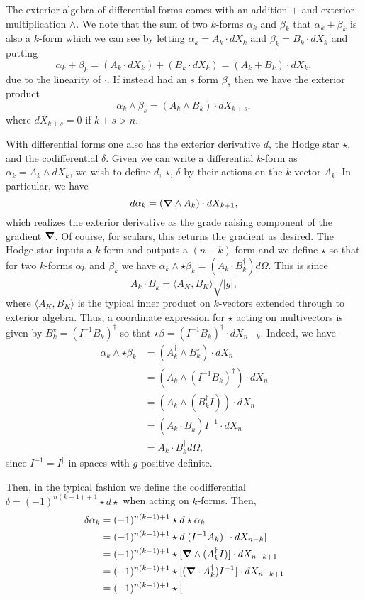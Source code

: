 \documentclass[12pt]{article}
\begin{document}
The exterior algebra of differential forms comes with an addition $+$ and exterior multiplication $\wedge$.  We note that the sum of two $k$-forms $\alpha_k$ and $\beta_k$ that $\alpha_k+\beta_k$ is also a $k$-form which we can see by letting $\alpha_k = A_k \cdot dX_k$ and $\beta_k = B_k \cdot dX_k$ and putting
\[
\alpha_k + \beta_k = (A_k \cdot dX_k)+(B_k \cdot dX_k) = (A_k + B_k) \cdot dX_k,
\]
due to the linearity of $\cdot$.  If instead had an $s$ form $\beta_s$ then we have the exterior product
\[
\alpha_k \wedge \beta_s = (A_k \wedge B_k) \cdot dX_{k+s},
\]
where $dX_{k+s}=0$ if $k+s>n$.  

With differential forms one also has the exterior derivative $d$, the Hodge star $\star$, and the codifferential $\delta$.  Given we can write a differential $k$-form as $\alpha_k = A_k \wedge dX_k$, we wish to define $d$, $\star$, $\delta$ by their actions on the $k$-vector $A_k$.  In particular, we have
\[
d \alpha_k = (\boldsymbol{\nabla} \wedge A_k) \cdot dX_{k+1},
\]
which realizes the exterior derivative as the grade raising component of the gradient $\boldsymbol{\nabla}$. Of course, for scalars, this returns the gradient as desired.  The Hodge star inputs a $k$-form and outputs a $(n-k)$-form and we define $\star$ so that for two $k$-forms $\alpha_k$ and $\beta_k$ we have $\alpha_k \wedge \star \beta_k  = (A_k\cdot B_k^\dagger)d\Omega$.  This is since
\[
A_k \cdot B_k^\dagger = \langle A_{K}, B_{K} \rangle \sqrt{|g|},
\]
where $\langle A_{K}, B_{K} \rangle$ is the typical inner product on $k$-vectors extended through to exterior algebra. Thus, a coordinate expression for $\star$ acting on multivectors is given by $B_k^\star = (I^{-1} B_k)^\dagger$ so that $\star \beta = (I^{-1} B_k)^\dagger \cdot dX_{n-k}$.  Indeed, we have
\begin{align*}
    \alpha_k \wedge \star \beta_k &= (A_k^\dagger \wedge B_k^\star) \cdot dX_n\\
    &= (A_k \wedge (I^{-1}B_k)^\dagger )\cdot dX_n\\
    &= (A_k \wedge (B_k^\dagger I))\cdot dX_n\\
    &= (A_k \cdot B_k^\dagger) I^{-1} \cdot dX_n\\
    &= A_k \cdot B_k^\dagger d\Omega,
\end{align*}
since $I^{-1}=I^\dagger$ in spaces with $g$ positive definite.


Then, in the typical fashion we define the codifferential $\delta = (-1)^{n(k-1)+1} \star d \star$ when acting on $k$-forms.  Then,
\begin{align*}
    \delta \alpha_k &= (-1)^{n(k-1)+1} \star d \star \alpha_k \\
    &= (-1)^{n(k-1)+1} \star d [(I^{-1} A_k)^\dagger  \cdot dX_{n-k}]\\
    &= (-1)^{n(k-1)+1} \star [\boldsymbol{\nabla} \wedge (A_k^\dagger I)] \cdot dX_{n-k+1}\\
    &= (-1)^{n(k-1)+1} \star [(\boldsymbol{\nabla} \cdot A_k^\dagger)I^{-1} ] \cdot dX_{n-k+1}\\
    &= (-1)^{n(k-1)+1} \star [
\end{align*}
\end{document}
